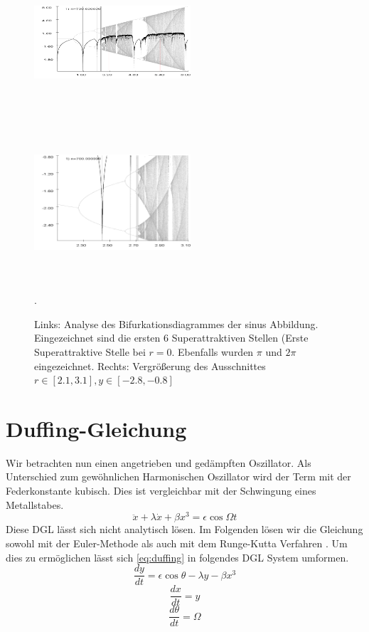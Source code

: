 \documentclass{scrartcl}
\begin{document}
\begin{figure}[!htbp]
\centering
\includegraphics[height=220px, width= 220px]{bifurkation-sin}
\includegraphics[height= 220px, width= 220px]{bifurkation-sin-zoom}
\caption{Links: Analyse des Bifurkationsdiagrammes der sinus Abbildung. Eingezeichnet sind die ersten 6 Superattraktiven Stellen (Erste Superattraktive Stelle bei $r=0$. Ebenfalls wurden $\pi$ und $2\pi$ eingezeichnet. Rechts: Vergrößerung des Ausschnittes $r \in [2.1,3.1], y\in[-2.8,-0.8]$}. 
\label{fig:bifurc-sin}
\end{figure}
\newpage
\section { Duffing-Gleichung}
Wir betrachten nun einen angetrieben und gedämpften Oszillator. Als Unterschied zum gewöhnlichen Harmonischen Oszillator wird der Term mit der Federkonstante kubisch. Dies ist vergleichbar mit der Schwingung eines Metallstabes.
\begin{equation}
\ddot{x}+\lambda\dot{x}+\beta x^3=\epsilon\cos{\Omega t}
\label{eq:duffing}
\end{equation} 
Diese DGL lässt sich nicht analytisch lösen.
Im Folgenden lösen wir die Gleichung sowohl mit der Euler-Methode \parencite{wiki:euler} als auch mit dem Runge-Kutta Verfahren \parencite{wiki:runge}. Um dies zu ermöglichen lässt sich \eqref{eq:duffing} in folgendes DGL System umformen.
\begin{equation}\frac{dy}{dt}=\epsilon\cos{\theta}-\lambda y - \beta x^3\end{equation}
\begin{equation}\frac{dx}{dt}=y\end{equation}
\begin{equation}\frac{d\theta}{dt}=\Omega\end{equation}
\newline
\end{document}
